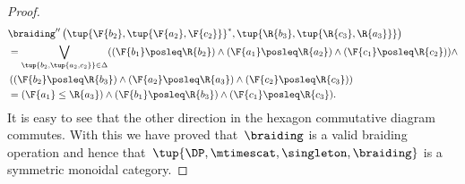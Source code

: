 \begin{proof}
\begin{equation}
\begin{aligned}
            &\braiding'' \left(\tup{\F{b_2},\tup{\F{a_2},\F{c_2}}}^*,\tup{\R{b_3},\tup{\R{c_3},\R{a_3}}} \right)\\
            &=\bigvee_{\tup{b_2,\tup{a_2,c_2}}\in \Delta}(\left(\F{b_1}\posleq \R{b_2} \right)\wedge \left(\F{a_1}\posleq \R{a_2} \right)\wedge \left( \F{c_1}\posleq \R{c_2}\right)) \wedge\\
            & \left(\left(\F{b_2}\posleq \R{b_3}\right)\wedge \left(\F{a_2}\posleq \R{a_3}\right) \wedge \left(\F{c_2}\posleq \R{c_3}\right)\right)\\
            &=(\F{a_1}\leq \R{a_3}) \wedge (\F{b_1}\posleq \R{b_3}) \wedge (\F{c_1}\posleq \R{c_3}).
        \end{aligned}
    \end{equation}
    It is easy to see that the other direction in the hexagon commutative diagram commutes. With this we have proved that~$\braiding$ is a valid braiding operation and hence that~$\tup{\DP, \mtimescat, \singleton, \braiding}$ is a symmetric monoidal category.
\end{proof}
